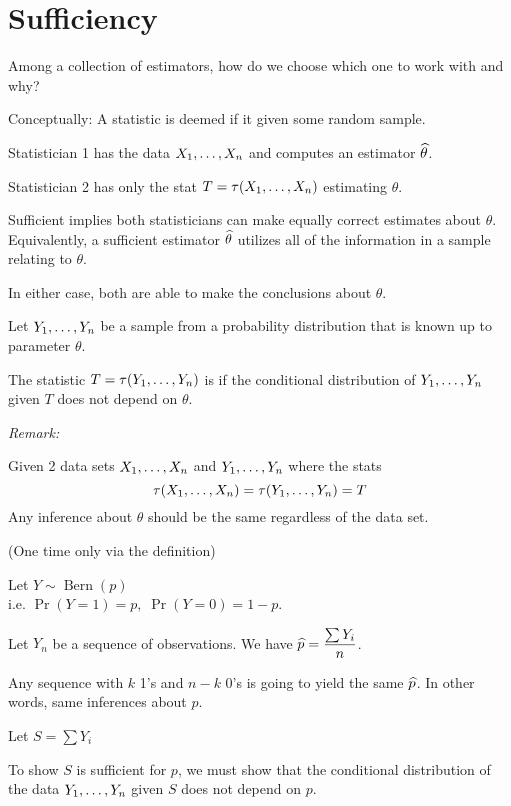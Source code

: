 \section{Sufficiency}
\disc Among a collection of estimators, how do we choose which one to work with and why?

\nl Conceptually: A statistic is deemed  if it  given some random sample.

\example

\nl Statistician 1 has the data ${X}_1, \dots, {X}_n$ and computes an estimator $\widehat{\theta}$.

\nl Statistician 2 has only the stat $T = \tau({X}_1, \dots, {X}_n)$ estimating $\theta$.

\nl Sufficient implies both statisticians can make equally correct estimates about $\theta$. Equivalently, a sufficient estimator $\widehat{\theta}$ utilizes all of the information in a sample relating to $\theta$.

\nl In either case, both are able to make the  conclusions about $\theta$. 

 Let $Y_1, \dots, Y_n$ be a sample from a probability distribution that is known up to parameter $\theta$.

\nl The statistic $T = \tau(Y_1, \dots, Y_n)$ is  if the conditional distribution of $Y_1, \dots, Y_n$ given $T$ does not depend on $\theta$.

\nnl \textit{Remark:} 

\nl Given 2 data sets ${X}_1, \dots, {X}_n$ and ${Y}_1, \dots, {Y}_n$ where the stats $$\tau({X}_1, \dots, {X}_n) = \tau({Y}_1, \dots, {Y}_n) = T$$
Any inference about $\theta$ should be the same regardless of the data set.

\example (One time only via the definition)

\nl Let $Y \sim \operatorname{Bern}(p)$\\
i.e. $\Pr(Y=1) = p,\; \Pr(Y=0) = 1-p$.

\nl Let $Y_n$ be a sequence of observations. We have $\widehat{p} = \dfrac{\sum Y_i}{n}$.

\nl {}

\nl Any sequence with $k$ 1's and $n-k$ 0's is going to yield the same $\widehat{p}$. In other words, same inferences about $p$.

\nl Let $S = \sum Y_i$

\nl To show $S$ is sufficient for $p$, we must show that the conditional distribution of the data $Y_1, \dots, Y_n$ given $S$ does not depend on $p$.

